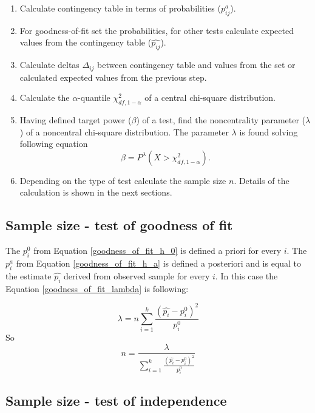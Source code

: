 \documentclass{article}
\begin{document}
\begin{enumerate}
    \item Calculate contingency table in terms of probabilities ($p^a_{ij}$).
    \item For goodness-of-fit set the probabilities, for other tests calculate expected values from the contingency table ($\widehat{p_{ij}}$).
    \item Calculate deltas $\Delta_{ij}$ between contingency table and values from the set or calculated expected values from the previous step.
    \item Calculate the $\alpha$-quantile $\chi^2_{df,1-\alpha}$ of a central chi-square distribution.
    \item Having defined target power ($\beta$) of a test, find the noncentrality parameter ($\lambda$) of a noncentral chi-square distribution. 
    The parameter $\lambda$ is found solving following equation
    \begin{equation}
        \beta = P^\lambda\left(X > \chi^2_{df,1-\alpha} \right).
    \end{equation}
    \item Depending on the type of test calculate the sample size $n$. Details of the calculation is shown in the next sections.
\end{enumerate}


\subsection{Sample size - test of goodness of fit}
The $p_i^0$ from Equation \ref{goodness_of_fit_h_0} is defined a priori for every $i$.
The $p_i^a$ from Equation \ref{goodness_of_fit_h_a} is defined a posteriori and is equal to the estimate $\widehat{p_{i}}$ derived from observed sample for every $i$.
In this case the Equation \ref{goodness_of_fit_lambda} is following:

\begin{equation}
    \lambda = n \sum_{i=1}^k \frac{\left(\widehat{p_{i}}-p_{i}^0\right)^2}{p_{i}^0}
\end{equation}
So
\begin{equation}
    n = \frac{\lambda}{\sum_{i=1}^k \frac{\left(\widehat{p_{i}}-p_{i}^0\right)^2}{p_{i}^0}}
\end{equation}


\subsection{Sample size - test of independence}
\end{document}
